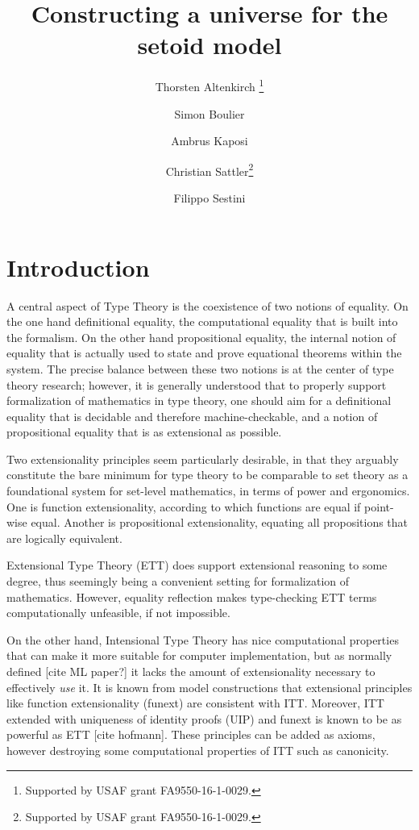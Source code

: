 \documentclass{easychair}
\title{Constructing a universe for the setoid model}
\author{
  Thorsten Altenkirch \inst{1}\thanks{Supported by USAF grant FA9550-16-1-0029.}
\and
  Simon Boulier
\and
  Ambrus Kaposi \inst{2}
\and
  Christian Sattler\inst{1}\thanks{Supported by USAF grant FA9550-16-1-0029.}
\and
  Filippo Sestini\inst{1}
}
\institute{
  School of Computer Science, University of Nottingham, UK\\
  \email{\{psztxa,pszcs1,psxfs5\}@nottingham.ac.uk}
  \and
  E{\"o}tv{\"o}s Lor{\'a}nd University, Budapest, Hungary\\
  \email{akaposi@inf.elte.hu}
}
\begin{document}
\maketitle

\section{Introduction}

A central aspect of Type Theory is the coexistence of two notions of
equality. On the one hand definitional equality, the computational equality that
is built into the formalism. On the other hand propositional equality, the
internal notion of equality that is actually used to state and prove equational
theorems within the system. The precise balance between these two notions is at
the center of type theory research; however, it is generally understood that to
properly support formalization of mathematics in type theory, one should aim for
a definitional equality that is decidable and therefore machine-checkable, and a
notion of propositional equality that is as extensional as possible.

Two extensionality principles seem particularly desirable, in that they arguably
constitute the bare minimum for type theory to be comparable to set theory as a
foundational system for set-level mathematics, in terms of power and ergonomics.
One is function extensionality, according to which functions are equal if
point-wise equal. Another is propositional extensionality, equating all
propositions that are logically equivalent.

Extensional Type Theory (ETT) does support extensional reasoning to some degree,
thus seemingly being a convenient setting for formalization of
mathematics. However, equality reflection makes type-checking ETT terms
computationally unfeasible, if not impossible.

On the other hand, Intensional Type Theory has nice computational properties
that can make it more suitable for computer implementation, but as normally
defined [cite ML paper?] it lacks the amount of extensionality necessary to
effectively \emph{use} it.
%
It is known from model constructions that extensional principles like function
extensionality (funext) are consistent with ITT.
%
Moreover, ITT extended with uniqueness of identity proofs (UIP) and funext is
known to be as powerful as ETT [cite hofmann]. These principles can be added as
axioms, however destroying some computational properties of ITT such as
canonicity.
\end{document}
